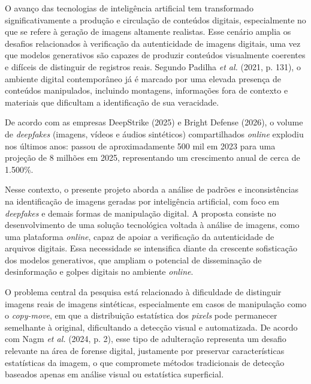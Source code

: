 \newpage
{}
\justifying
O avanço das tecnologias de inteligência artificial tem transformado
significativamente a produção e circulação de conteúdos digitais, especialmente
no que se refere à geração de imagens altamente realistas. Esse cenário amplia os
desafios relacionados à verificação da autenticidade de imagens digitais, uma vez
que modelos generativos são capazes de produzir conteúdos visualmente coerentes e
difíceis de distinguir de registros reais. Segundo Padilha \textit{et al.} (2021,
p. 131), o ambiente digital contemporâneo já é marcado por uma elevada presença
de conteúdos manipulados, incluindo montagens, informações fora de contexto e
materiais que dificultam a identificação de sua veracidade.

De acordo com as empresas DeepStrike (2025) e Bright Defense (2026), o volume de
\textit{deepfakes} (imagens, vídeos e áudios sintéticos) compartilhados
\textit{online} explodiu nos últimos anos: passou de aproximadamente 500 mil em
2023 para uma projeção de 8 milhões em 2025, representando um crescimento anual
de cerca de 1.500\%.

Nesse contexto, o presente projeto aborda a análise de padrões e inconsistências
na identificação de imagens geradas por inteligência artificial, com foco em
\textit{deepfakes} e demais formas de manipulação digital. A proposta consiste no
desenvolvimento de uma solução tecnológica voltada à análise de imagens, como uma
plataforma \textit{online}, capaz de apoiar a verificação da autenticidade de
arquivos digitais. Essa necessidade se intensifica diante da crescente
sofisticação dos modelos generativos, que ampliam o potencial de disseminação de
desinformação e golpes digitais no ambiente \textit{online}.

O problema central da pesquisa está relacionado à dificuldade de distinguir
imagens reais de imagens sintéticas, especialmente em casos de manipulação como o
\textit{copy-move}, em que a distribuição estatística dos \textit{pixels} pode
permanecer semelhante à original, dificultando a detecção visual e automatizada.
De acordo com Nagm \textit{et al.} (2024, p. 2), esse tipo de adulteração
representa um desafio relevante na área de forense digital, justamente por
preservar características estatísticas da imagem, o que compromete métodos
tradicionais de detecção baseados apenas em análise visual ou estatística
superficial.

